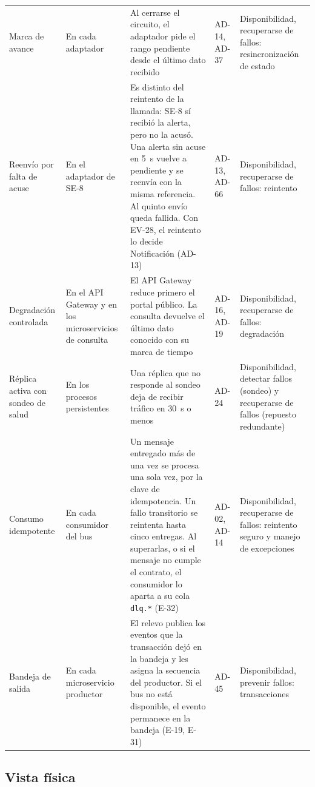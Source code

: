 \documentclass[11pt,letterpaper]{article}
\begin{document}
\begin{longtable}{L{2.5cm} L{2.8cm} L{5.0cm} L{1.6cm} L{3.4cm}}
Marca de avance & En cada adaptador & Al cerrarse el circuito, el adaptador pide el rango pendiente
desde el último dato recibido & AD-14, AD-37 & Disponibilidad, recuperarse de fallos: resincronización de estado \\
Reenvío por falta de acuse & En el adaptador de SE-8 & Es distinto del reintento de la llamada: SE-8
sí recibió la alerta, pero no la acusó. Una alerta sin acuse en \qty{5}{\second} vuelve a pendiente
y se reenvía con la misma referencia. Al quinto envío queda fallida. Con EV-28, el reintento lo
decide Notificación (AD-13) & AD-13, AD-66 & Disponibilidad, recuperarse de fallos: reintento \\
Degradación controlada & En el API Gateway y en los microservicios de consulta & El API Gateway
reduce primero el portal público. La consulta devuelve el último dato conocido con su marca de
tiempo & AD-16, AD-19 & Disponibilidad, recuperarse de fallos: degradación \\
Réplica activa con sondeo de salud & En los procesos persistentes & Una réplica que no responde al
sondeo deja de recibir tráfico en \qty{30}{\second} o menos & AD-24 & Disponibilidad, detectar fallos (sondeo) y recuperarse de fallos (repuesto redundante) \\
Consumo idempotente & En cada consumidor del bus & Un mensaje entregado más de una vez se procesa
una sola vez, por la clave de idempotencia. Un fallo transitorio se reintenta hasta cinco entregas.
Al superarlas, o si el mensaje no cumple el contrato, el consumidor lo aparta a su cola
\texttt{dlq.*} (E-32) & AD-02, AD-14 & Disponibilidad, recuperarse de fallos: reintento seguro y manejo de excepciones \\
Bandeja de salida & En cada microservicio productor & El relevo publica los eventos que la
transacción dejó en la bandeja y les asigna la secuencia del productor. Si el bus no está
disponible, el evento permanece en la bandeja (E-19, E-31) & AD-45 & Disponibilidad, prevenir fallos: transacciones \\
\end{longtable}

\subsection{Vista física}
\label{sec:vista-fisica}
\end{document}
